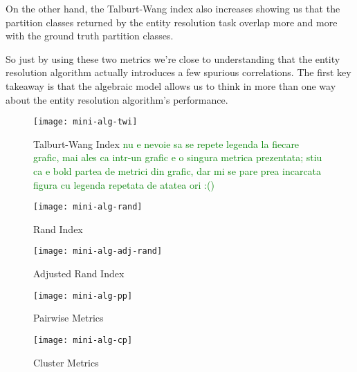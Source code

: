 \documentclass[11pt]{article}
\begin{document}
    On the other hand, the Talburt-Wang index also increases showing us that the
    partition classes returned by the entity resolution task overlap more and
    more with the ground truth partition classes.
    
    So just by using these two metrics we're close to understanding that the
    entity resolution algorithm actually introduces a few spurious correlations.
    The first key takeaway is that the algebraic model allows us to think in
    more than one way about the entity resolution algorithm's performance.

    \begin{figure}
        \begin{minipage}{0.49\textwidth}
            \centering
            \texttt{[image: mini-alg-twi]}
            \caption{Talburt-Wang Index
            \textcolor{green}{nu e nevoie sa se repete legenda la fiecare grafic, mai ales ca intr-un grafic e o singura metrica prezentata; stiu ca e bold partea de metrici din grafic, dar mi se pare prea incarcata figura cu legenda repetata de atatea ori :()}
            }
            \label{fig:mini-alg-twi}
        \end{minipage}    
        \begin{minipage}{0.49\textwidth}
            \centering
            \texttt{[image: mini-alg-rand]}
            \caption{Rand Index}
            \label{fig:mini-alg-rand}
        \end{minipage}    
        \begin{minipage}{0.49\textwidth}
            \centering
            \texttt{[image: mini-alg-adj-rand]}
            \caption{Adjusted Rand Index}
            \label{fig:mini-alg-adj-rand}
        \end{minipage}    
        \begin{minipage}{0.49\textwidth}
            \centering
            \texttt{[image: mini-alg-pp]}
            \caption{Pairwise Metrics}
            \label{fig:mini-alg-pp}
        \end{minipage}    
        \begin{minipage}{0.49\textwidth}
            \centering
            \texttt{[image: mini-alg-cp]}
            \caption{Cluster Metrics}
            \label{fig:mini-alg-cp}
        \end{minipage}    
        
    \end{figure}\label{algebraic-prffig}
\end{document}
